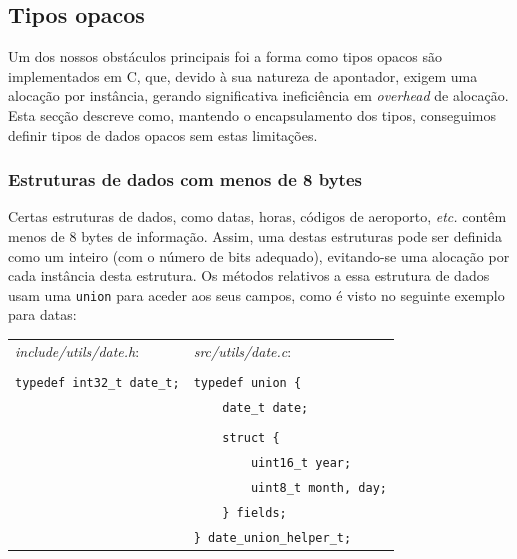\documentclass[12pt, a4paper]{article}
\begin{document}
\subsection{Tipos opacos}

Um dos nossos obstáculos principais foi a forma como tipos opacos são implementados em C, que,
devido à sua natureza de apontador, exigem uma alocação por instância, gerando significativa
ineficiência em \emph{overhead} de alocação. Esta secção descreve como, mantendo o encapsulamento
dos tipos, conseguimos definir tipos de dados opacos sem estas limitações.

\subsubsection{Estruturas de dados com menos de 8 bytes}

Certas estruturas de dados, como datas, horas, códigos de aeroporto, \emph{etc.} contêm menos de
8 bytes de informação. Assim, uma destas estruturas pode ser definida como um inteiro (com o número
de bits adequado), evitando-se uma alocação por cada instância desta estrutura. Os métodos relativos
a essa estrutura de dados usam uma \texttt{union} para aceder aos seus campos, como é visto no
seguinte exemplo para datas:

\begin{spacing}{1}
\begin{center}
    \begin{tabular}{ |l|l| }
        \hline
        \emph{include/utils/date.h}: & \emph{src/utils/date.c}: \\
        & \\
        \texttt{typedef int32\_t date\_t;} & \texttt{typedef union \{} \\
                                           & \texttt{\ \ \ \ date\_t date;} \\
                                           & \texttt{} \\
                                           & \texttt{\ \ \ \ struct \{} \\
                                           & \texttt{\ \ \ \ \ \ \ \ uint16\_t year;} \\
                                           & \texttt{\ \ \ \ \ \ \ \ uint8\_t month, day;} \\
                                           & \texttt{\ \ \ \ \} fields;} \\
                                           & \texttt{\} date\_union\_helper\_t;} \\
        \hline
    \end{tabular}
\end{center}
\end{spacing}
\end{document}
